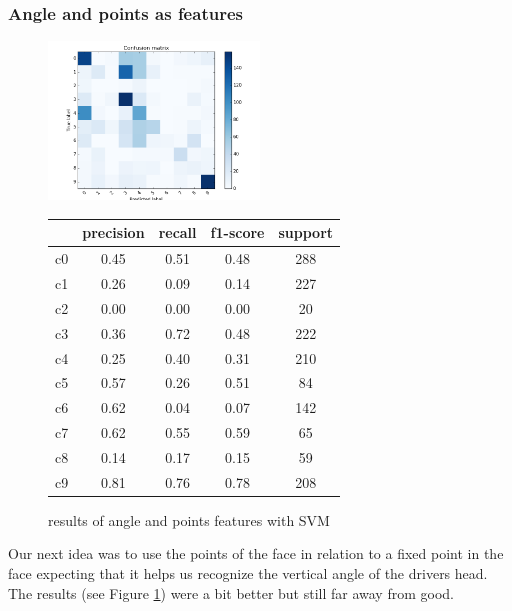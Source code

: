 \documentclass[10pt,twocolumn,letterpaper]{article}
\begin{document}
\subsubsection{Angle and points as features}
\begin{figure}[h]
	\centering
	\includegraphics[width=0.5\textwidth]{all_vs_all_headpose}\hspace{0.01\textwidth}
	\begin{tabular}{c||c|c|c|c}
	  & precision&recall&f1-score&support\\	\hline
	 c0&0.45&0.51&0.48&288\\
	 c1&0.26&0.09&0.14&227\\
	 c2&0.00&0.00&0.00&20\\
	 c3&0.36&0.72&0.48&222\\
	 c4&0.25&0.40&0.31&210\\
	 c5&0.57&0.26&0.51&84\\
	 c6&0.62&0.04&0.07&142\\
	 c7&0.62&0.55&0.59&65\\
	 c8&0.14&0.17&0.15&59\\
	 c9&0.81&0.76&0.78&208
	\end{tabular}
	\caption{results of angle and points features with SVM}
	\label{headposeandpoints_feature}
	\end{figure}

Our next idea was to use the points of the face in relation to a fixed point in the face expecting that it helps us recognize the vertical angle of the drivers head. The results (see Figure \ref{headposeandpoints_feature}) were a bit better but still far away from good.
\end{document}
